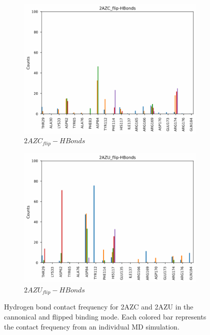 \begin{figure}[!ht]
\begin{subfigure}{.45\textwidth}
     \includegraphics[width=.95\linewidth]{chapter4/2AZC_flip/2AZC_flip-HBonds.pdf}
     \caption{$2AZC_{flip}-HBonds$}
     \label{fig:2AZC_flip-HBonds}
   \end{subfigure}
    \begin{subfigure}{.45\textwidth}
     \centering
     \includegraphics[width=.95\linewidth]{chapter4/2AZU_flip/2AZU_flip-HBonds.pdf}
     \caption{$2AZU_{flip}-HBonds$}
     \label{fig:2AZU_flip-HBonds}
   \end{subfigure}
\caption{Hydrogen bond contact frequency for 2AZC and 2AZU in the cannonical and flipped binding mode. Each colored bar represents the contact frequency from an individual MD simulation.}
\label{fig:HBonds}
\end{figure}  

